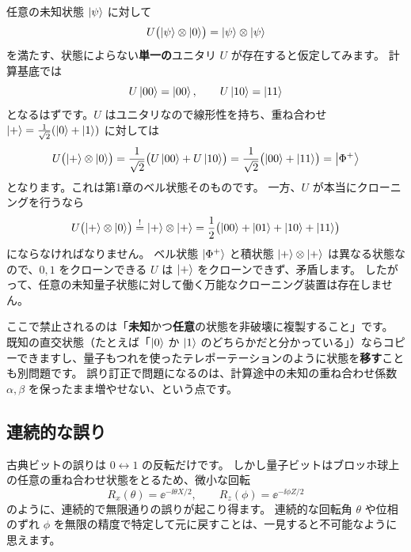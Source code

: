 任意の未知状態 $\ket{\psi}$ に対して
\begin{equation}
  U\bigl(\ket{\psi}\otimes\ket{0}\bigr) = \ket{\psi}\otimes\ket{\psi}
\end{equation}
を満たす、状態によらない\textbf{単一の}ユニタリ $U$ が存在すると仮定してみます。
計算基底では
\begin{equation}
  U\ket{00} = \ket{00},
  \qquad
  U\ket{10} = \ket{11}
\end{equation}
となるはずです。$U$ はユニタリなので線形性を持ち、重ね合わせ $\ket{+}=\frac{1}{\sqrt2}(\ket0+\ket1)$ に対しては
\begin{equation}
  U\bigl(\ket{+}\otimes\ket{0}\bigr)
  = \frac{1}{\sqrt2}\bigl(U\ket{00}+U\ket{10}\bigr)
  = \frac{1}{\sqrt2}\bigl(\ket{00}+\ket{11}\bigr)
  = \ket{\Phi^+}
\end{equation}
となります。これは第1章のベル状態そのものです。
一方、$U$ が本当にクローニングを行うなら
\begin{equation}
  U\bigl(\ket{+}\otimes\ket{0}\bigr) \overset{!}{=} \ket{+}\otimes\ket{+}
  = \frac12\bigl(\ket{00}+\ket{01}+\ket{10}+\ket{11}\bigr)
\end{equation}
にならなければなりません。
ベル状態 $\ket{\Phi^+}$ と積状態 $\ket{+}\otimes\ket{+}$ は異なる状態なので、$0,1$ をクローンできる $U$ は $\ket{+}$ をクローンできず、矛盾します。
したがって、任意の未知量子状態に対して働く万能なクローニング装置は存在しません。

\begin{notebox}
  ここで禁止されるのは「\textbf{未知}かつ\textbf{任意}の状態を非破壊に複製すること」です。
  既知の直交状態（たとえば「$\ket0$ か $\ket1$ のどちらかだと分かっている」）ならコピーできますし、量子もつれを使ったテレポーテーションのように状態を\textbf{移す}ことも別問題です。
  誤り訂正で問題になるのは、計算途中の未知の重ね合わせ係数 $\alpha,\beta$ を保ったまま増やせない、という点です。
\end{notebox}

\subsection{連続的な誤り}

古典ビットの誤りは $0 \leftrightarrow 1$ の反転だけです。
しかし量子ビットはブロッホ球上の任意の重ね合わせ状態をとるため、微小な回転
\begin{equation}
  R_x(\theta) = \ee^{-\ii \theta X/2}, \qquad R_z(\phi) = \ee^{-\ii \phi Z/2}
\end{equation}
のように、連続的で無限通りの誤りが起こり得ます。
連続的な回転角 $\theta$ や位相のずれ $\phi$ を無限の精度で特定して元に戻すことは、一見すると不可能なように思えます。

